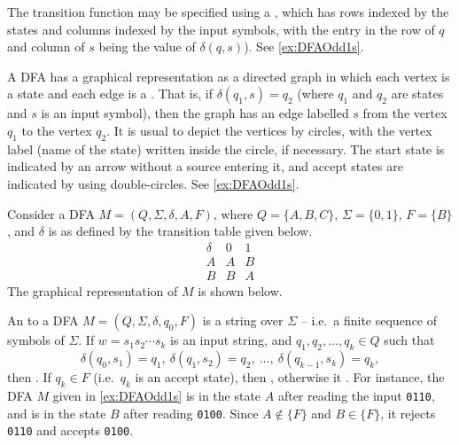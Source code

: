 The transition function may be specified using a , which has rows indexed by the states and columns indexed by the input symbols, with the entry in the row of $q$ and column of $s$ being the value of $\delta(q, s)$). See \cref{ex:DFAOdd1s}.

A DFA has a graphical representation as a directed graph in which each vertex is a state and each edge is a . That is, if $\delta(q_1, s) = q_2$ (where $q_1$ and $q_2$ are states and $s$ is an input symbol), then the graph has an edge labelled $s$ from the vertex $q_1$ to the vertex $q_2$. It is usual to depict the vertices by circles, with the vertex label (name of the state) written inside the circle, if necessary. The start state is indicated by an arrow without a source entering it, and accept states are indicated by using double-circles. See \cref{ex:DFAOdd1s}.

\begin{Example}\label{ex:DFAOdd1s}
Consider a DFA $M = (Q, \Sigma, \delta, A, F)$, where $Q = \{A, B, C\}$, $\Sigma = \{0, 1\}$, $F = \{B\}$, and $\delta$ is as defined by the transition table given below.
\begin{equation*}
\begin{array}{r|cc}
\delta & 0 & 1 \\
\hline
A & A & B \\
B & B & A
\end{array}
\end{equation*}
The graphical representation of $M$ is shown below.
\begin{center}
\end{center}
\end{Example}

An  to a DFA $M = (Q, \Sigma, \delta, q_0, F)$ is a string over $\Sigma$ -- i.e.\ a finite sequence of symbols of $\Sigma$. If $w = s_1 s_2 \cdots s_k$ is an input string, and $q_1, q_2, \ldots, q_k \in Q$ such that
\begin{equation*}
\delta(q_0, s_1) = q_1,~ \delta(q_1, s_2) = q_2,~ \ldots,~ \delta(q_{k-1}, s_k) = q_k,
\end{equation*}
then . If $q_k \in F$ (i.e.\ $q_k$ is an accept state), then , otherwise it . For instance, the DFA $M$ given in \cref{ex:DFAOdd1s} is in the state $A$ after reading the input \texttt{0110}, and is in the state $B$ after reading \texttt{0100}. Since $A \notin \{F\}$ and $B \in \{F\}$, it rejects \texttt{0110} and accepts \texttt{0100}.

